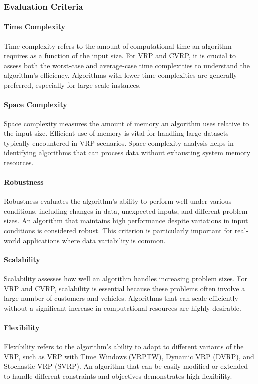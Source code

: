 \documentclass[
]{article}
\begin{document}
  \subsubsection{Evaluation Criteria}
  
  \paragraph{Time Complexity} Time complexity refers to the amount of computational time an algorithm requires as a function of the input size. For VRP and CVRP, it is crucial to assess both the worst-case and average-case time complexities to understand the algorithm’s efficiency. Algorithms with lower time complexities are generally preferred, especially for large-scale instances.
  
  \paragraph{Space Complexity} Space complexity measures the amount of memory an algorithm uses relative to the input size. Efficient use of memory is vital for handling large datasets typically encountered in VRP scenarios. Space complexity analysis helps in identifying algorithms that can process data without exhausting system memory resources.
  
  \paragraph{Robustness} Robustness evaluates the algorithm’s ability to perform well under various conditions, including changes in data, unexpected inputs, and different problem sizes. An algorithm that maintains high performance despite variations in input conditions is considered robust. This criterion is particularly important for real-world applications where data variability is common.
  
  \paragraph{Scalability} Scalability assesses how well an algorithm handles increasing problem sizes. For VRP and CVRP, scalability is essential because these problems often involve a large number of customers and vehicles. Algorithms that can scale efficiently without a significant increase in computational resources are highly desirable.
  
  \paragraph{Flexibility} Flexibility refers to the algorithm’s ability to adapt to different variants of the VRP, such as VRP with Time Windows (VRPTW), Dynamic VRP (DVRP), and Stochastic VRP (SVRP). An algorithm that can be easily modified or extended to handle different constraints and objectives demonstrates high flexibility.
  
\end{document}
